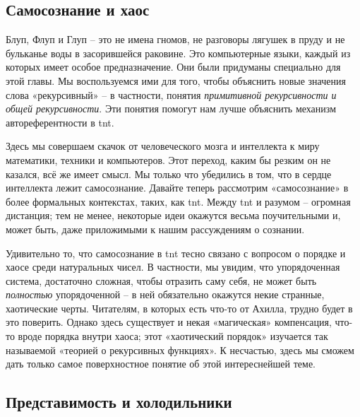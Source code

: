 \documentclass[../main.tex]{subfiles}
\begin{document}

\subsection{Самосознание и хаос}

Блуп, Флуп и Глуп \--- это не имена гномов, не разговоры лягушек в пруду и не бульканье воды в засорившейся раковине. Это компьютерные языки, каждый из которых имеет особое предназначение. Они были придуманы специально для этой главы. Мы воспользуемся ими для того, чтобы объяснить новые значения слова «рекурсивный» \--- в частности, понятия \emph{примитивной рекурсивности и общей рекурсивности}. Эти понятия помогут нам лучше объяснить механизм автореферентности в \acs{tnt}.

Здесь мы совершаем скачок от человеческого мозга и интеллекта к миру математики, техники и компьютеров. Этот переход, каким бы резким он не казался, всё же имеет смысл. Мы только что убедились в том, что в сердце интеллекта лежит самосознание. Давайте теперь рассмотрим «самосознание» в более формальных контекстах, таких, как \acs{tnt}\@. Между \acs{tnt} и разумом \--- огромная дистанция; тем не менее, некоторые идеи окажутся весьма поучительными и, может быть, даже приложимыми к нашим рассуждениям о сознании.

Удивительно то, что самосознание в \acs{tnt} тесно связано с вопросом о порядке и хаосе среди натуральных чисел. В частности, мы увидим, что упорядоченная система, достаточно сложная, чтобы отразить саму себя, не может быть \emph{полностью} упорядоченной \--- в ней обязательно окажутся некие странные, хаотические черты. Читателям, в которых есть что-то от Ахилла, трудно будет в это поверить. Однако здесь существует и некая «магическая» компенсация, что-то вроде порядка внутри хаоса; этот «хаотический порядок» изучается так называемой «теорией о рекурсивных функциях». К несчастью, здесь мы сможем дать только самое поверхностное понятие об этой интереснейшей теме.


\subsection{Представимость и холодильники}
\end{document}
